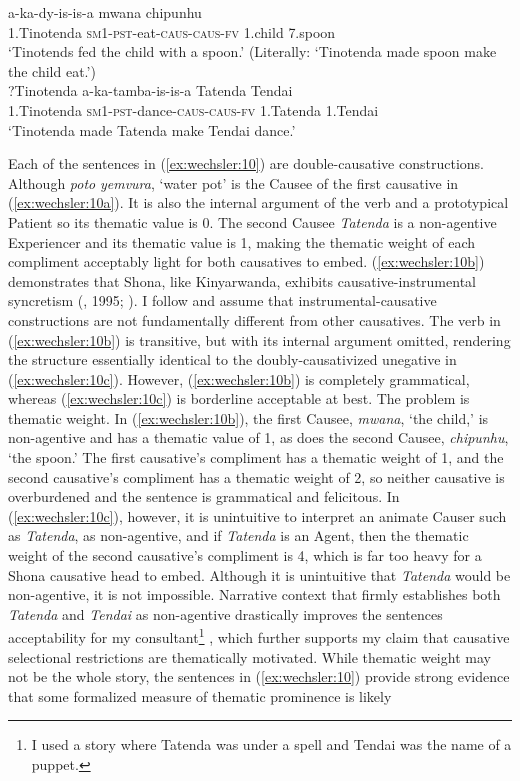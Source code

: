 \documentclass[output=paper,modfonts,nonflat,colorlinks,citecolor=brown]{langsci/langscibook}
\begin{document}
\ex\label{ex:wechsler:10b}  
 {a-ka-dy-is-is-a}  {{mwana}}  {{chipunhu}}\\
 1.Tinotenda  \textsc{sm}1-\textsc{pst}{}-eat-\textsc{caus}{}-\textsc{caus}{}-\textsc{fv}  {1.child}  {7.spoon}\\
\glt `Tinotends fed the child with a spoon.’
(Literally: ‘Tinotenda made spoon make the child eat.’)\\

\ex\label{ex:wechsler:10c}
?{Tinotenda}  {{a-ka-tamba-is-is-a}}  {{Tatenda}}  {{Tendai}}\\
 1.Tinotenda  {\textsc{sm}1-\textsc{pst}{}-dance-\textsc{caus}{}-\textsc{caus}{}-\textsc{fv}}  {1.Tatenda}  {1.Tendai}\\
\glt `Tinotenda made Tatenda make Tendai dance.'
\z
\z

Each of the sentences in (\ref{ex:wechsler:10}) are double-causative constructions. Although \textit{poto} \textit{yemvura}, ‘water pot’ is the Causee of the first causative in (\ref{ex:wechsler:10a}). It is also the internal argument of the verb and a prototypical Patient so its thematic value is 0. The second Causee \textit{Tatenda} is a non-agentive Experiencer and its thematic value is 1, making the thematic weight of each compliment acceptably light for both causatives to embed. (\ref{ex:wechsler:10b}) demonstrates that Shona, like Kinyarwanda, exhibits causative-instrumental syncretism (\citealt{Kimenyi1980}, 1995; \citealt{Peterson2007,Jerro2013}). I follow \citet{Jerro2013} and assume that instrumental-causative constructions are not fundamentally different from other causatives. The verb in (\ref{ex:wechsler:10b}) is transitive, but with its internal argument omitted, rendering the structure essentially identical to the doubly-causativized unegative in (\ref{ex:wechsler:10c}). However, (\ref{ex:wechsler:10b}) is completely grammatical, whereas (\ref{ex:wechsler:10c}) is borderline acceptable at best. The problem is thematic weight. In (\ref{ex:wechsler:10b}), the first Causee, \textit{mwana}, ‘the child,’ is non-agentive and has a thematic value of 1, as does the second Causee, \textit{chipunhu}, ‘the spoon.’ The first causative’s compliment has a thematic weight of 1, and the second causative’s compliment has a thematic weight of 2, so neither causative is overburdened and the sentence is grammatical and felicitous. In (\ref{ex:wechsler:10c}), however, it is unintuitive to interpret an animate Causer such as \textit{Tatenda}, as non-agentive, and if \textit{Tatenda} is an Agent, then the thematic weight of the second causative’s compliment is 4, which is far too heavy for a Shona causative head to embed. Although it is unintuitive that \textit{Tatenda} would be non-agentive, it is not impossible. Narrative context that firmly establishes both \textit{Tatenda} and \textit{Tendai} as non-agentive drastically improves the sentences acceptability for my consultant\footnote{I used a story where Tatenda was under a spell and Tendai was the name of a puppet.} , which further supports my claim that causative selectional restrictions are thematically motivated. While thematic weight may not be the whole story, the sentences in (\ref{ex:wechsler:10}) provide strong evidence that some formalized measure of thematic prominence is likely 
\end{document}
